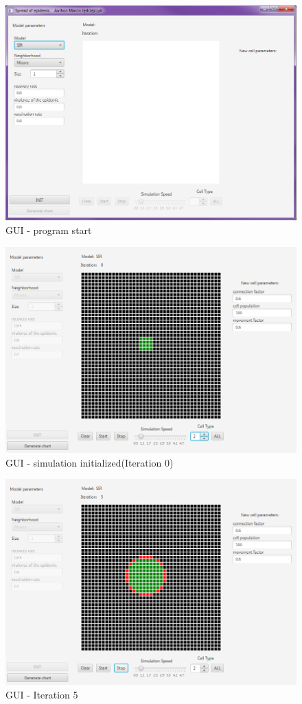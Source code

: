\documentclass[a4paper, 11pt]{article}
\begin{document}

\begin{figure}[H]
\includegraphics[width=\textwidth]{guiinit.PNG} 
\caption{GUI - program start}
\end{figure}
\iffalse
\begin{figure}[H]
\includegraphics[width=\textwidth]{i0.PNG} 
\caption{GUI - simulation initialized(Iteration 0) }
\end{figure}
\begin{figure}[H]
\includegraphics[width=\textwidth]{i5.PNG} 
\caption{GUI - Iteration 5}
\end{figure}
\end{document}
